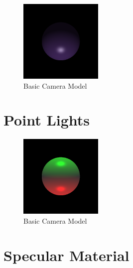 \documentclass{article}
\begin{document}
\begin{figure}[H]
  \begin{center}
  \includegraphics[width=150px]{Images/quadSphere.png}
  \caption{Basic Camera Model}
  \label{fig:basiccammod}
  \end{center}
\end{figure}

\section{Point Lights}

\begin{figure}[H]
  \begin{center}
  \includegraphics[width=150px]{Images/pointLight.png}
  \caption{Basic Camera Model}
  \label{fig:basiccammod}
  \end{center}
\end{figure}

\section{Specular Material}
\end{document}
